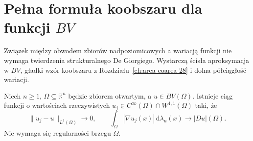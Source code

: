 \section{Pełna formuła koobszaru dla funkcji \texorpdfstring{$BV$}{BV}}
Związek między obwodem zbiorów nadpoziomicowych a wariacją
funkcji nie wymaga twierdzenia strukturalnego De Giorgiego.
Wystarczą ścisła aproksymacja w $BV$, gładki wzór
koobszaru z Rozdziału~\ref{ch:area-coarea-28} i dolna
półciągłość wariacji.

\begin{lemat}
\label{lem:BV-strict-approx}
Niech $n\ge1$, $\Omega\subseteq\mathbb R^n$ będzie
zbiorem otwartym, a $u\in BV(\Omega)$.
Istnieje ciąg funkcji o wartościach rzeczywistych
$u_j\in C^\infty(\Omega)\cap W^{1,1}(\Omega)$ taki, że
\[
 \|u_j-u\|_{L^1(\Omega)}\longrightarrow0,
 \qquad
 \int_\Omega|\nabla u_j(x)|\,\mathrm d\lambda_n(x)
 \longrightarrow |Du|(\Omega).
\]
Nie wymaga się regularności brzegu $\Omega$.
\end{lemat}

